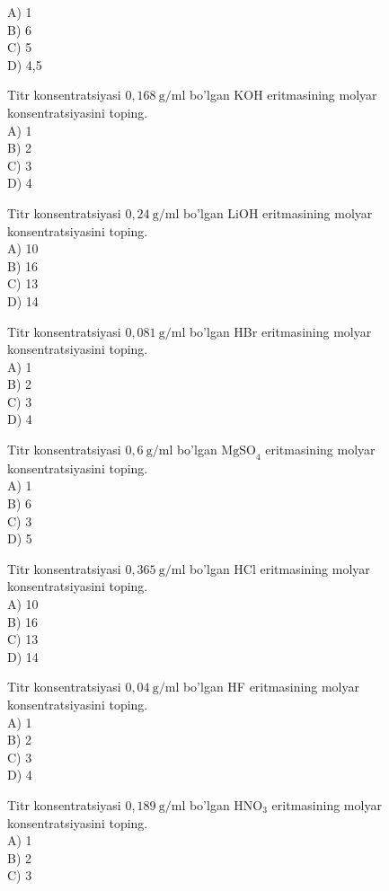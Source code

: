 A) 1\\
B) 6\\
C) 5\\
D) 4,5
  \item Titr konsentratsiyasi $0,168 \mathrm{~g} / \mathrm{ml}$ bo'lgan KOH eritmasining molyar konsentratsiyasini toping.\\
A) 1\\
B) 2\\
C) 3\\
D) 4
  \item Titr konsentratsiyasi $0,24 \mathrm{~g} / \mathrm{ml}$ bo'lgan LiOH eritmasining molyar konsentratsiyasini toping.\\
A) 10\\
B) 16\\
C) 13\\
D) 14
  \item Titr konsentratsiyasi $0,081 \mathrm{~g} / \mathrm{ml}$ bo'lgan HBr eritmasining molyar konsentratsiyasini toping.\\
A) 1\\
B) 2\\
C) 3\\
D) 4
  \item Titr konsentratsiyasi $0,6 \mathrm{~g} / \mathrm{ml}$ bo'lgan $\mathrm{MgSO}_{4}$ eritmasining molyar konsentratsiyasini toping.\\
A) 1\\
B) 6\\
C) 3\\
D) 5
  \item Titr konsentratsiyasi $0,365 \mathrm{~g} / \mathrm{ml}$ bo'lgan HCl eritmasining molyar konsentratsiyasini toping.\\
A) 10\\
B) 16\\
C) 13\\
D) 14
  \item Titr konsentratsiyasi $0,04 \mathrm{~g} / \mathrm{ml}$ bo'lgan HF eritmasining molyar konsentratsiyasini toping.\\
A) 1\\
B) 2\\
C) 3\\
D) 4
  \item Titr konsentratsiyasi $0,189 \mathrm{~g} / \mathrm{ml}$ bo'lgan $\mathrm{HNO}_{3}$ eritmasining molyar konsentratsiyasini toping.\\
A) 1\\
B) 2\\
C) 3\\
